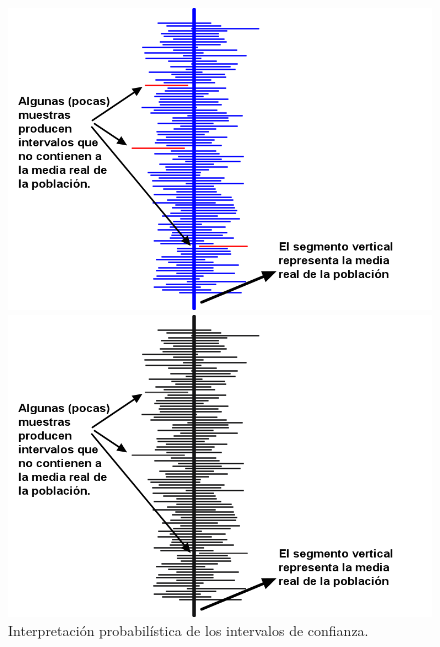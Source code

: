 \begin{figure}[p]
\begin{center}
\begin{enColor}
\includegraphics[width=14cm]{../fig/Cap06-InterpretacionIntervalosConfianza.png}
\end{enColor}
\begin{bn}
\includegraphics[width=14cm]{../fig/Cap06-InterpretacionIntervalosConfianza-bn.png}
\end{bn}
\caption{Interpretación probabilística de los intervalos de confianza.}
\label{cap06:fig:InterpretacionProbabilisticaIntervalosConfianza}
\end{center}
\end{figure}


